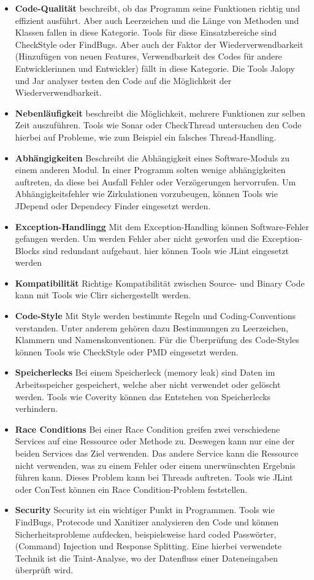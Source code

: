 \begin{itemize}
\item \textbf{Code-Qualität} beschreibt, ob das Programm seine Funktionen richtig und effizient ausführt. Aber auch Leerzeichen und die Länge von Methoden und Klassen fallen in diese Kategorie. Tools für diese Einsatzbereiche sind CheckStyle oder FindBugs. Aber auch der Faktor der Wiederverwendbarkeit (Hinzufügen von neuen Features, Verwendbarkeit des Codes für andere Entwicklerinnen und Entwickler) fällt in diese Kategorie. Die Tools Jalopy und Jar analyser testen den Code auf die Möglichkeit der Wiederverwendbarkeit. 
\item \textbf{Nebenläufigkeit}
beschreibt die Möglichkeit, mehrere Funktionen zur selben Zeit auszuführen. Tools wie Sonar oder CheckThread untersuchen den Code hierbei auf Probleme, wie zum Beispiel ein falsches Thread-Handling. 
\item \textbf{Abhängigkeiten}
Beschreibt die Abhängigkeit eines Software-Moduls zu einem anderen Modul. In einer Programm solten wenige abhängigkeiten auftreten, da diese bei Ausfall Fehler oder Verzögerungen hervorrufen. Um Abhängigkeitsfehler wie Zirkulationen vorzubeugen, können Tools wie JDepend oder Dependecy Finder eingesetzt werden.
\item \textbf{Exception-Handlingg} Mit dem Exception-Handling können Software-Fehler gefangen werden. Um werden Fehler aber nicht geworfen und die Exception-Blocks sind redundant aufgebaut. hier können Tools wie JLint eingesetzt werden
\item \textbf{Kompatibilität} Richtige Kompatibilität zwischen Source- und Binary Code kann mit Tools wie Clirr sichergestellt werden. 
\item \textbf{Code-Style} Mit Style werden bestimmte Regeln und Coding-Conventions verstanden. Unter anderem gehören dazu Bestimmungen zu Leerzeichen, Klammern und Namenskonventionen. Für die Überprüfung des Code-Styles können Tools wie CheckStyle oder PMD eingesetzt werden.
\item \textbf{Speicherlecks}
Bei einem Speicherleck (memory leak) sind Daten im Arbeitsspeicher gespeichert,  welche aber nicht verwendet oder gelöscht werden. Tools wie Coverity können das Entstehen von Speicherlecks verhindern.
\item \textbf{Race Conditions}
Bei einer Race Condition greifen zwei verschiedene Services auf eine Ressource oder Methode zu. Deswegen kann nur eine der beiden Services das Ziel verwenden. Das andere Service kann die Ressource nicht verwenden, was zu einem Fehler oder einem unerwünschten Ergebnis führen kann. Dieses Problem kann bei Threads auftreten. Tools wie JLint oder ConTest können ein Race Condition-Problem feststellen.
\item \textbf{Security}
Security ist ein wichtiger Punkt in Programmen. Tools wie FindBugs, Protecode und Xanitizer analysieren den Code und können Sicherheitsprobleme aufdecken, beispielsweise hard coded Passwörter, (Command) Injection und Response Splitting. \cite{goseva2015capability} Eine hierbei verwendete Technik ist die Taint-Analyse, wo der Datenfluss einer Dateneingaben überprüft wird. \cite{jung2014sensitive}
\end{itemize}

